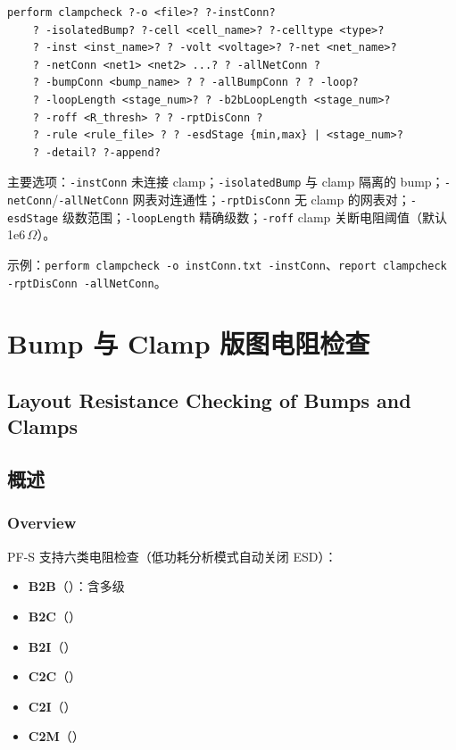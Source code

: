\begin{lstlisting}
perform clampcheck ?-o <file>? ?-instConn?
    ? -isolatedBump? ?-cell <cell_name>? ?-celltype <type>?
    ? -inst <inst_name>? ? -volt <voltage>? ?-net <net_name>?
    ? -netConn <net1> <net2> ...? ? -allNetConn ?
    ? -bumpConn <bump_name> ? ? -allBumpConn ? ? -loop?
    ? -loopLength <stage_num>? ? -b2bLoopLength <stage_num>?
    ? -roff <R_thresh> ? ? -rptDisConn ?
    ? -rule <rule_file> ? ? -esdStage {min,max} | <stage_num>?
    ? -detail? ?-append?
\end{lstlisting}

主要选项：\texttt{-instConn} 未连接 clamp；\texttt{-isolatedBump} 与 clamp 隔离的 bump；\texttt{-netConn}/\texttt{-allNetConn} 网表对连通性；\texttt{-rptDisConn} 无 clamp 的网表对；\texttt{-esdStage} 级数范围；\texttt{-loopLength} 精确级数；\texttt{-roff} clamp 关断电阻阈值（默认 1e6\,$\Omega$）。

示例：\texttt{perform clampcheck -o instConn.txt -instConn}、\texttt{report clampcheck -rptDisConn -allNetConn}。

\section{Bump 与 Clamp 版图电阻检查}
\subsection*{Layout Resistance Checking of Bumps and Clamps}

\subsection{概述}
\subsubsection*{Overview}

PF-S 支持六类电阻检查（低功耗分析模式自动关闭 ESD）：
\begin{itemize}
  \item \textbf{B2B}（）：含多级
  \item \textbf{B2C}（）
  \item \textbf{B2I}（）
  \item \textbf{C2C}（）
  \item \textbf{C2I}（）
  \item \textbf{C2M}（）
\end{itemize}

